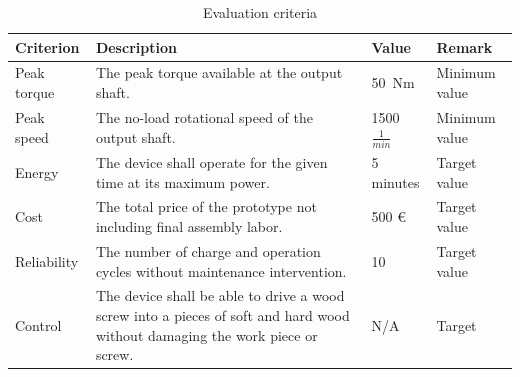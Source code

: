 \documentclass[headinclude=true]{scrartcl}
\begin{document}
\begin{table}
\caption{Evaluation criteria}
\label{tab:evaluation}
 \begin{tabulary}{\linewidth}{lLll}
 \toprule
 Criterion & Description & Value & Remark \\ \midrule
 Peak torque & The peak torque available at the output shaft. & 50~Nm & Minimum value \\
 Peak speed & The no-load rotational speed of the output shaft. & 1500 $\frac{1}{min}$ & Minimum value \\
 Energy & The device shall operate for the given time at its maximum power. & 5 minutes & Target value \\
 Cost & The total price of the prototype not including final assembly labor. & 500 \euro & Target value \\
 Reliability & The number of charge and operation cycles without maintenance intervention. & 10 & Target value \\
 Control & The device shall be able to drive a wood screw into a pieces of soft and hard wood without damaging the work piece or screw. & N/A & Target \\ \bottomrule
 
 
  
 \end{tabulary}
\end{table}








\printbibliography

\appendix
\end{document}
